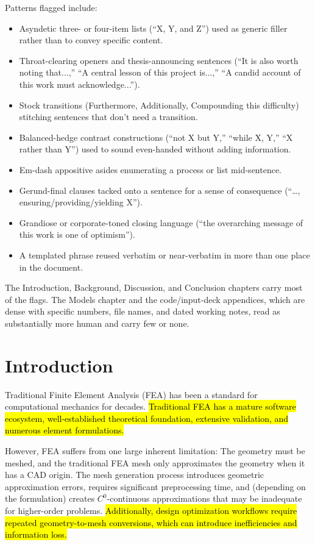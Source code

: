 \documentclass[12pt,report,justified]{SANDreport}
\begin{document}
Patterns flagged include:
\begin{itemize}
\item Asyndetic three- or four-item lists (``X, Y, and Z'') used as generic filler rather than to convey specific content.
\item Throat-clearing openers and thesis-announcing sentences (``It is also worth noting that...,'' ``A central lesson of this project is...,'' ``A candid account of this work must acknowledge...'').
\item Stock transitions (Furthermore, Additionally, Compounding this difficulty) stitching sentences that don't need a transition.
\item Balanced-hedge contrast constructions (``not X but Y,'' ``while X, Y,'' ``X rather than Y'') used to sound even-handed without adding information.
\item Em-dash appositive asides enumerating a process or list mid-sentence.
\item Gerund-final clauses tacked onto a sentence for a sense of consequence (``\ldots, ensuring/providing/yielding X'').
\item Grandiose or corporate-toned closing language (``the overarching message of this work is one of optimism'').
\item A templated phrase reused verbatim or near-verbatim in more than one place in the document.
\end{itemize}

The Introduction, Background, Discussion, and Conclusion chapters carry most of the flags. The Models chapter and the code/input-deck appendices, which are dense with specific numbers, file names, and dated working notes, read as substantially more human and carry few or none.

\chapter{Introduction}
\label{Intro}


Traditional Finite Element Analysis (FEA) has been a standard for computational mechanics for decades.  \hl{Traditional FEA has a mature software ecosystem, well-established theoretical foundation, extensive validation, and numerous element formulations.}

However, FEA suffers from one large inherent limitation:  The geometry must be meshed, and the traditional FEA mesh only approximates the geometry when it has a CAD origin.  The mesh generation process introduces geometric approximation errors, requires significant preprocessing time, and (depending on the formulation) creates $C^0$-continuous approximations that may be inadequate for higher-order problems.  \hl{Additionally, design optimization workflows require repeated geometry-to-mesh conversions, which can introduce inefficiencies and information loss.}
\end{document}
